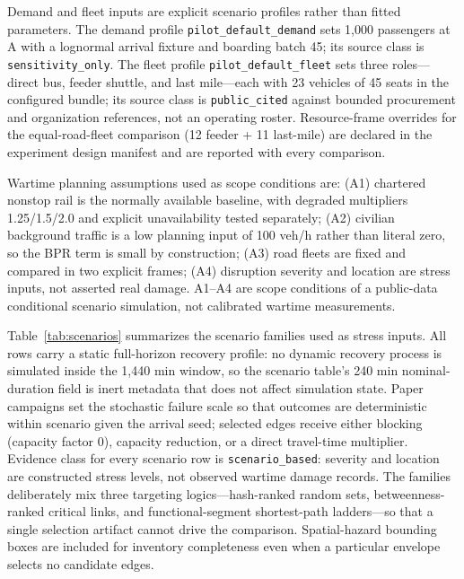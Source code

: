 \documentclass{ieeeaccess}
\begin{document}
Demand and fleet inputs are explicit scenario profiles rather than fitted parameters. The demand profile \texttt{pilot\_\allowbreak default\_\allowbreak demand} sets 1{,}000 passengers at A with a lognormal arrival fixture and boarding batch 45; its source class is \texttt{sensitivity\_\allowbreak only}. The fleet profile \texttt{pilot\_\allowbreak default\_\allowbreak fleet} sets three roles---direct bus, feeder shuttle, and last mile---each with 23 vehicles of 45 seats in the configured bundle; its source class is \texttt{public\_\allowbreak cited} against bounded procurement and organization references, not an operating roster. Resource-frame overrides for the equal-road-fleet comparison (12 feeder + 11 last-mile) are declared in the experiment design manifest and are reported with every comparison.

Wartime planning assumptions used as scope conditions are: (A1) chartered nonstop rail is the normally available baseline, with degraded multipliers 1.25/1.5/2.0 and explicit unavailability tested separately; (A2) civilian background traffic is a low planning input of 100 veh/h rather than literal zero, so the BPR term is small by construction; (A3) road fleets are fixed and compared in two explicit frames; (A4) disruption severity and location are stress inputs, not asserted real damage. A1--A4 are scope conditions of a public-data conditional scenario simulation, not calibrated wartime measurements.

Table~\ref{tab:scenarios} summarizes the scenario families used as stress inputs. All rows carry a static full-horizon recovery profile: no dynamic recovery process is simulated inside the 1{,}440 min window, so the scenario table's 240 min nominal-duration field is inert metadata that does not affect simulation state. Paper campaigns set the stochastic failure scale so that outcomes are deterministic within scenario given the arrival seed; selected edges receive either blocking (capacity factor 0), capacity reduction, or a direct travel-time multiplier. Evidence class for every scenario row is \texttt{scenario\_\allowbreak based}: severity and location are constructed stress levels, not observed wartime damage records. The families deliberately mix three targeting logics---hash-ranked random sets, betweenness-ranked critical links, and functional-segment shortest-path ladders---so that a single selection artifact cannot drive the comparison. Spatial-hazard bounding boxes are included for inventory completeness even when a particular envelope selects no candidate edges.
\end{document}
